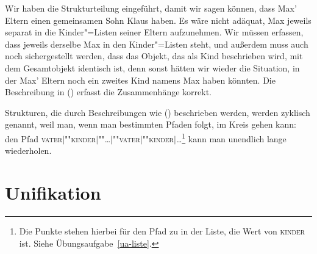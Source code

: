 Wir haben die Strukturteilung eingeführt, damit wir sagen können, dass
Max' Eltern einen gemeinsamen Sohn Klaus haben. Es wäre nicht adäquat,
Max jeweils separat in die Kinder"=Listen seiner Eltern aufzunehmen.
Wir müssen erfassen, dass jeweils derselbe Max in den Kinder"=Listen
steht, und außerdem muss auch noch sichergestellt werden, dass das
Objekt, das als Kind beschrieben wird, mit dem Gesamtobjekt identisch
ist, denn sonst hätten wir wieder die Situation, in der Max' Eltern
noch ein zweites Kind namens Max haben könnten.
Die Beschreibung in () erfasst die Zusammenhänge korrekt.
\begin{figure}[htbp]
\ea
\label{bsp-avm-zyklen}
 
\z
\vspace{-\baselineskip}\end{figure}
Strukturen, die durch Beschreibungen wie () beschrieben werden, werden zyklisch genannt, weil man, wenn man bestimmten
Pfaden folgt, im Kreis gehen kann: \ZB den Pfad \textsc{vater$|$""kinder$|$""\ldots$|$""vater$|$""kinder$|$\ldots}\footnote{
  Die Punkte stehen hierbei für den Pfad zu  in der Liste, die
  Wert von \textsc{kinder} ist. Siehe Übungsaufgabe~\ref{ua-liste}.%
}
kann man unendlich lange wiederholen.

\section{Unifikation}
\label{sec-unifikation}

